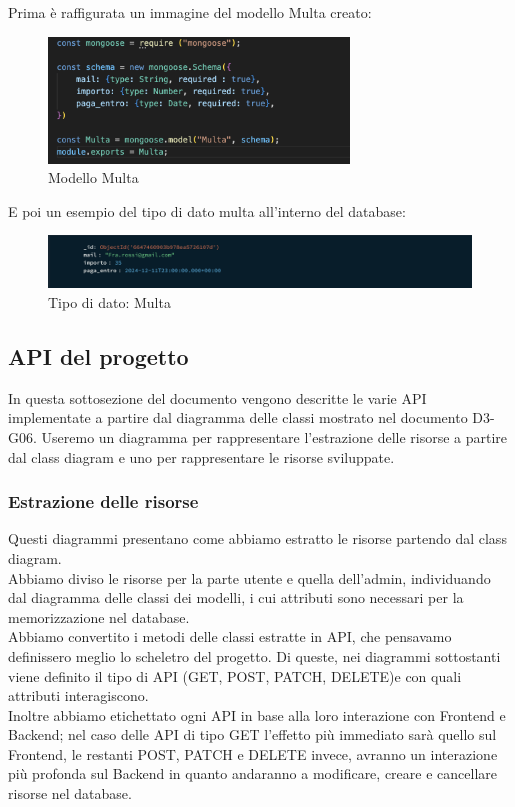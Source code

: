 \documentclass{article}
\begin{document}
\begin{enumerate}
    Prima è raffigurata un immagine del modello Multa creato:
        \begin{figure}[H]
        \centering
        \includegraphics[width=80mm]{D4/Images/ModelMulta.png}
        \caption{Modello Multa}
    \end{figure}

    E poi un esempio del tipo di dato multa all'interno del database:
    
    \begin{figure}[H]
        \centering
        \includegraphics[width=130mm]{D4/Images/multaDB.png}
        \caption{Tipo di dato: Multa}
    \end{figure}
\end{enumerate}

\subsection{API del progetto}
In questa sottosezione del documento vengono descritte le varie API implementate a partire dal diagramma delle classi mostrato nel documento D3-G06. Useremo un diagramma per rappresentare l’estrazione delle risorse a partire dal class diagram e uno per rappresentare le risorse sviluppate.

\subsubsection{Estrazione delle risorse}
Questi diagrammi presentano come abbiamo estratto le risorse partendo dal class diagram.\\
Abbiamo diviso le risorse per la parte utente e quella dell'admin, individuando dal diagramma delle classi dei modelli, i cui attributi sono necessari per la memorizzazione nel database.\\
Abbiamo convertito i metodi delle classi estratte in API, che pensavamo definissero meglio lo scheletro del progetto.
Di queste, nei diagrammi sottostanti viene definito il tipo di API (GET, POST, PATCH, DELETE)e con quali attributi interagiscono.\\
Inoltre abbiamo etichettato ogni API in base alla loro interazione con Frontend e Backend; nel caso delle API di tipo GET l'effetto più immediato sarà quello sul Frontend, le restanti  POST, PATCH e DELETE invece, avranno un interazione più profonda sul Backend in quanto andaranno a modificare, creare e cancellare risorse nel database.
\end{document}
